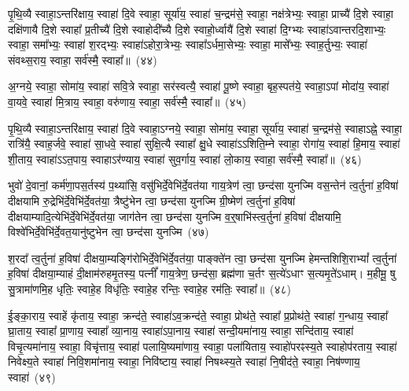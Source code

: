 {\anuvakamend[{}]}

पृ॒थि॒व्यै स्वाहा॒\-ऽन्तरि॑क्षाय॒ स्वाहा॑ दि॒वे स्वाहा॒ सूर्या॑य॒ स्वाहा॑ च॒न्द्रम॑से॒ स्वाहा॒ नक्ष॑त्रेभ्यः॒ स्वाहा॒ प्राच्यै॑ दि॒शे स्वाहा॒ दक्षि॑णायै दि॒शे स्वाहा᳚ प्र॒तीच्यै॑ दि॒शे स्वाहोदी᳚च्यै दि॒शे स्वाहो॒र्ध्वायै॑ दि॒शे स्वाहा॑ दि॒ग्भ्यः स्वाहा॑\-ऽ\-वान्तरदि॒शाभ्यः॒ स्वाहा॒ समा᳚भ्यः॒ स्वाहा॑ श॒रद्भ्यः॒ स्वाहा॑\-ऽहोरा॒त्रेभ्यः॒ स्वाहा᳚\-ऽर्धमा॒सेभ्यः॒ स्वाहा॒ मासे᳚भ्यः॒ स्वाह॒र्तुभ्यः॒ स्वाहा॑ संवथ्स॒राय॒ स्वाहा॒ सर्व॑स्मै॒ स्वाहा᳚॥~(४४)\ip

{\anuvakamend[{}]}

अ॒ग्नये॒ स्वाहा॒ सोमा॑य॒ स्वाहा॑ सवि॒त्रे स्वाहा॒ सर॑स्वत्यै॒ स्वाहा॑ पू॒ष्णे स्वाहा॒ बृह॒स्पत॑ये॒ स्वाहा॒\-ऽपां मोदा॑य॒ स्वाहा॑ वा॒यवे॒ स्वाहा॑ मि॒त्राय॒ स्वाहा॒ वरु॑णाय॒ स्वाहा॒ सर्व॑स्मै॒ स्वाहा᳚॥~(४५)\ip

{\anuvakamend[{}]}

पृ॒थि॒व्यै स्वाहा॒\-ऽन्तरि॑क्षाय॒ स्वाहा॑ दि॒वे स्वाहा॒\-ऽग्नये॒ स्वाहा॒ सोमा॑य॒ स्वाहा॒ सूर्या॑य॒ स्वाहा॑ च॒न्द्रम॑से॒ स्वाहा\-ऽह्ने॒ स्वाहा॒ रात्रि॑यै॒ स्वाह॒र्जवे॒ स्वाहा॑ सा॒धवे॒ स्वाहा॑ सुक्षि॒त्यै स्वाहा᳚ क्षु॒धे स्वाहा॑\-ऽऽ\-शिति॒म्ने स्वाहा॒ रोगा॑य॒ स्वाहा॑ हि॒माय॒ स्वाहा॑ शी॒ताय॒ स्वाहा॑\-ऽऽ\-त॒पाय॒ स्वाहा\-ऽर॑ण्याय॒ स्वाहा॑ सुव॒र्गाय॒ स्वाहा॑ लो॒काय॒ स्वाहा॒ सर्व॑स्मै॒ स्वाहा᳚॥~(४६)\ip

{\anuvakamend[{}]}

भुवो॑ दे॒वानां॒ कर्म॑णा॒पस॒र्तस्य॑ प॒थ्या॑सि॒ वसु॑भिर्दे॒वेभि॑र्दे॒वत॑या गाय॒त्रेण॑ त्वा॒ छन्द॑सा युनज्मि वस॒न्तेन॑ त्व॒र्तुना॑ ह॒विषा॑ दीक्षयामि रु॒द्रेभि॑र्दे॒वेभि॑र्दे॒वत॑या॒ त्रैष्टु॑भेन त्वा॒ छन्द॑सा युनज्मि ग्री॒ष्मेण॑ त्व॒र्तुना॑ ह॒विषा॑ दीक्षयाम्यादि॒त्येभि॑\-र्दे॒वेभि॑र्दे॒वत॑या॒ जाग॑तेन त्वा॒ छन्द॑सा युनज्मि व॒र्॒\mbox{}षाभि॑स्त्व॒र्तुना॑ ह॒विषा॑ दीक्षयामि॒ विश्वे॑भिर्दे॒वेभि॑र्दे॒वत॒यानु॑ष्टुभेन त्वा॒ छन्द॑सा युनज्मि~(४७)\ip

श॒रदा᳚ त्व॒र्तुना॑ ह॒विषा॑ दीक्षया॒म्यङ्गि॑रोभिर्दे॒वेभि॑र्दे॒वत॑या॒ पाङ्क्ते॑न त्वा॒ छन्द॑सा युनज्मि हेमन्तशिशि॒रा\-भ्यां᳚ त्व॒र्तुना॑ ह॒विषा॑ दीक्षया॒म्याहं दी॒क्षाम॑रुहमृ॒तस्य॒ पत्नीं᳚ गाय॒त्रेण॒ छन्द॑सा॒ ब्रह्म॑णा च॒र्तꣳ स॒त्ये॑\-ऽधाꣳ स॒त्यमृ॒ते॑\-ऽधाम्। म॒हीमू॒ षु सु॒त्रामा॑णमि॒ह धृतिः॒ स्वाहे॒ह विधृ॑तिः॒ स्वाहे॒ह रन्तिः॒ स्वाहे॒ह रम॑तिः॒ स्वाहा᳚॥~(४८)\ip

{\anuvakamend[{}]}

ई॒ङ्का॒राय॒ स्वाहें कृ॑ताय॒ स्वाहा॒ क्रन्द॑ते॒ स्वाहा॑\-ऽव॒क्रन्द॑ते॒ स्वाहा॒ प्रोथ॑ते॒ स्वाहा᳚ प्र॒प्रोथ॑ते॒ स्वाहा॑ ग॒न्धाय॒ स्वाहा᳚ घ्रा॒ताय॒ स्वाहा᳚ प्रा॒णाय॒ स्वाहा᳚ व्या॒नाय॒ स्वाहा॑\-ऽपा॒नाय॒ स्वाहा॑ सन्दी॒यमा॑नाय॒ स्वाहा॒ सन्दि॑ताय॒ स्वाहा॑ विचृ॒त्यमा॑नाय॒ स्वाहा॒ विचृ॑त्ताय॒ स्वाहा॑ पलायि॒ष्यमा॑णाय॒ स्वाहा॒ पला॑यिताय॒ स्वाहो॑परꣴस्य॒ते स्वाहोप॑रताय॒ स्वाहा॑ निवेक्ष्य॒ते स्वाहा॑ निवि॒शमा॑नाय॒ स्वाहा॒ निवि॑ष्टाय॒ स्वाहा॑ निषथ्स्य॒ते स्वाहा॑ नि॒षीद॑ते॒ स्वाहा॒ निष॑ण्णाय॒ स्वाहा॑~(४९)\ip



